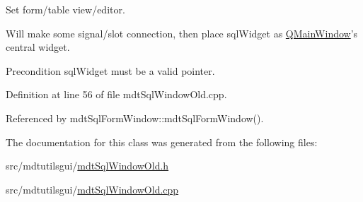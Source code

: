 Set form/table view/editor. 

Will make some signal/slot connection, then place sql\-Widget as \hyperlink{class_q_main_window}{Q\-Main\-Window}'s central widget.

\begin{DoxyPrecond}{Precondition}
sql\-Widget must be a valid pointer. 
\end{DoxyPrecond}


Definition at line 56 of file mdt\-Sql\-Window\-Old.\-cpp.



Referenced by mdt\-Sql\-Form\-Window\-::mdt\-Sql\-Form\-Window().



The documentation for this class was generated from the following files\-:\begin{DoxyCompactItemize}
\item 
src/mdtutilsgui/\hyperlink{mdt_sql_window_old_8h}{mdt\-Sql\-Window\-Old.\-h}\item 
src/mdtutilsgui/\hyperlink{mdt_sql_window_old_8cpp}{mdt\-Sql\-Window\-Old.\-cpp}\end{DoxyCompactItemize}
